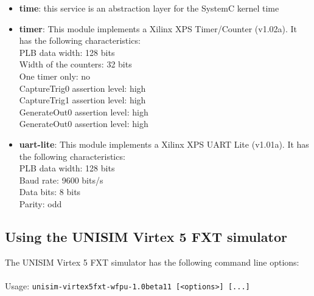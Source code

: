 \begin{itemize}
\item \textbf{time}: this service is an abstraction layer for the SystemC kernel time
\item \textbf{timer}: This module implements a Xilinx XPS Timer/Counter (v1.02a). It has the following characteristics:\\
PLB data width: 128 bits\\
Width of the counters: 32 bits\\
One timer only: no\\
CaptureTrig0 assertion level: high\\
CaptureTrig1 assertion level: high\\
GenerateOut0 assertion level: high\\
GenerateOut0 assertion level: high\\

\item \textbf{uart-lite}: This module implements a Xilinx XPS UART Lite (v1.01a). It has the following characteristics:\\
PLB data width: 128 bits\\
Baud rate: 9600 bits/s\\
Data bits: 8 bits\\
Parity: odd\\

\end{itemize}
\subsection{Using the UNISIM Virtex 5 FXT simulator}
\label{UNISIM Virtex 5 FXT_using}
The UNISIM Virtex 5 FXT simulator has the following command line options:\\
~\\
\noindent Usage: \texttt{unisim-virtex5fxt-wfpu-1.0beta11 [<options>] [...]}

